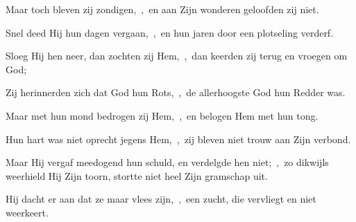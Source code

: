 \documentclass[12pt,twoside,a5paper]{article}
\begin{document}
\begin{halfparskip}

  Maar toch bleven zij zondigen,~\sep\ en aan Zijn wonderen geloofden zij niet.

  Snel deed Hij hun dagen vergaan,~\sep\ en hun jaren door een plotseling verderf.

  Sloeg Hij hen neer, dan zochten zij Hem,~\sep\ dan keerden zij terug en vroegen om God;

  Zij herinnerden zich dat God hun Rots,~\sep\ de allerhoogste God hun Redder was.

  Maar met hun mond bedrogen zij Hem,~\sep\ en belogen Hem met hun tong.

  Hun hart was niet oprecht jegens Hem,~\sep\ zij bleven niet trouw aan Zijn verbond.

  Maar Hij vergaf meedogend hun schuld, en verdelgde hen niet;~\sep\ zo dikwijls weerhield Hij Zijn toorn, stortte niet heel Zijn gramschap uit.

  Hij dacht er aan dat ze maar vlees zijn,~\sep\ een zucht, die vervliegt en niet weerkeert.
\end{halfparskip}
\end{document}
